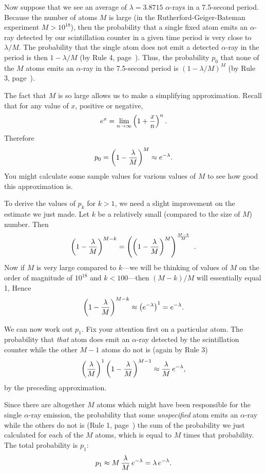 {{{{Now suppose that we see an average of $\lambda = 3.8715$ $\alpha$-rays in a 7.5-second period.   Because the number of atoms $M$ is large  (in the  Rutherford-Geiger-Bateman experiment  $M > 10^{18}$), then the probability that a single fixed atom emits an $\alpha$-ray detected by our scintillation counter in a given  time period is very close to $\lambda/M$.  The probability that the single atom does not emit a detected $\alpha$-ray in the period is  then $1-\lambda/M$ (by Rule 4, page~\pageref{rule4}). Thus, the probability $p_0$  that none of the $M$  atoms emits an  $\alpha$-ray in the 7.5-second period is $(1-\lambda/M)^M$ (by Rule 3, page~\pageref{rule3}).  

The fact that $M$ is so large allows us to make a simplifying approximation.  Recall that for any value of $x$, positive or negative,
\[
e^x = \lim_{n\rightarrow\infty}\left(1+{x\over n}\right)^n.
\]
Therefore  
\[
p_0 = \left(1-{\lambda\over M}\right)^M \approx 
	e^{-\lambda}.
\]
You might calculate some sample values for various values of $M$ to see how good this approximation is.

To derive the values of $p_k$ for $k>1$, we need a slight improvement on the estimate we just made.  Let $k$ be a relatively small (compared to the size of $M$) number. Then
\[
\left( 1-{\lambda\over M}\right)^{M-k}=\left(\left( 1-{\lambda\over M}\right)^M\right)^{{M-k\over M}}\ .
\]
Now if $M$ is very large compared to $k$---we will be thinking of values of $M$ on the order of magnitude of $10^{18}$ and $k<100$---then $(M-k)/M$
 will essentially equal 1, Hence
\[
\left( 1-{\lambda\over M}\right)^{M-k}\approx \left(e^{-\lambda}\right)^1=e^{-\lambda}.
\]

We can now work out  $p_1$. Fix your attention first on a particular atom.  The probability that {\em that\/} atom does emit
an $\alpha$-ray detected by the scintillation counter while the other $M-1$ atoms do not is (again by Rule 3)
\[
\left({\lambda\over M}\right)^1\left( 1-{\lambda\over M}\right)^{M-1}\approx {\lambda \over M}\,e^{-\lambda},
\]
by the preceding approximation.

Since there are altogether $M$ atoms which might have been responsible for the single $\alpha$-ray emission, the probability that some {\em unspecified\/}
atom emits an $\alpha$-ray while the others do not is (Rule 1, page~\pageref{rule1}) the sum of the probability we just calculated for each of the $M$ atoms, which is equal to $M$ times that probability.  The total probability is $p_1$:
\[
p_1 \approx M\,{\lambda \over M}\,e^{-\lambda} 
= \lambda \,e^{-\lambda}.
\]

}}}}
